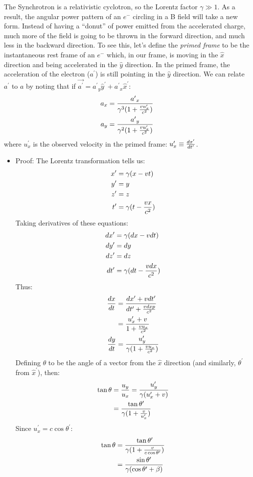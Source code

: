 \documentclass[11pt]{article}
\def\^{\hat}
\def\ap{{a^\prime}}
\def\xp{{x^{\prime}}}
\def\yp{{y^{\prime}}}
\def\zp{{z^{\prime}}}
\def\tp{{t^{\prime}}}
\def\upx{{u_x^\prime}}
\def\upy{{u_y^\prime}}
\begin{document}
The Synchrotron is a relativistic cyclotron, so the Lorentz factor 
$\gamma\gg1$.  As a result, the angular power pattern of an $e^-$ circling in a B
field will take a new form.  Instead of having a ``donut'' of power emitted
from the accelerated charge, much more of the field is going to be thrown in
the forward direction, and much less in the backward direction.  To see this,
let's define the {\it primed frame} to be the instantaneous rest frame of an
$e^-$ which, in our frame, is moving in the $\^x$ direction and being 
accelerated in the $\^y$ direction.
In the primed frame, the acceleration of the electron ($\ap$) is still pointing
in the $\^y$ direction.  We can relate $\ap$ to $a$ by
noting that if $\vec\ap=\ap_y\^y^\prime+\ap_x\^x^\prime$:
$$\begin{aligned}a_x&={\ap_x\over\gamma^3(1+{vu_x^\prime\over c^2})}\\ 
a_y&={\ap_y\over\gamma^2(1+{vu_x^\prime\over c^2})}\\ \end{aligned}$$
where $\upx$ is the observed velocity in the primed frame: 
$\upx\equiv{d\xp\over d\tp}$.
\begin{itemize}
\item Proof: The Lorentz transformation tells us:
$$\begin{aligned}\xp&=\gamma(x-vt)\\ 
\yp&=y\\ 
\zp&=z\\ 
\tp&=\gamma(t-{vx\over c^2})\\ \end{aligned}$$
Taking derivatives of these equations:
$$\begin{aligned}d\xp&=\gamma(dx-vdt)\\ 
d\yp&=dy\\ 
d\zp&=dz\\ 
d\tp&=\gamma(dt-{vdx\over c^2})\\ \end{aligned}$$
Thus:
$$\begin{aligned}{dx\over dt}&={d\xp+vd\tp\over d\tp+{vdxp\over c^2}}\\ 
&={\upx+v\over1+{vu_x\over c^2}}\\ 
{dy\over dt}&={\upy\over\gamma(1+{vu_x\over c^2})}\\ \end{aligned}$$
Defining $\theta$ to be the angle of a vector from the $\^x$ direction (and
similarly, $\theta^\prime$ from $\^x^\prime$), then:
$$\begin{aligned}\tan\theta&={u_y\over u_x}={\upy\over\gamma(\upx+v)}\\ 
&={\tan\theta^\prime\over\gamma(1+{v\over\upx})}\\ \end{aligned}$$
Since $\upx=c\cos\theta^\prime$:
$$\begin{aligned}\tan\theta&={\tan\theta^\prime\over\gamma(1+{v\over 
c\cos\theta^\prime})}\\ 
&={\sin\theta^\prime\over\gamma(\cos\theta^\prime+\beta)}\\ \end{aligned}$$
\end{itemize}
\end{document}
